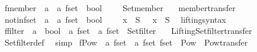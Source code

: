\begin{isabellebody}
\isanewline
{}\isamarkupfalse%
\ fmember\ {\isacharcolon}{\isacharcolon}\ {\isachardoublequoteopen}{\isacharprime}a\ {\isasymRightarrow}\ {\isacharprime}a\ fset\ {\isasymRightarrow}\ bool{\isachardoublequoteclose}\ {\isacharparenleft}\ {\isachardoublequoteopen}{\isacharbar}{\isasymin}{\isacharbar}{\isachardoublequoteclose}\ {}{}{\isacharparenright}\ \ Set{\isachardot}member\isanewline
\ \ \ member{\isacharunderscore}transfer%
\isadelimproof
\ %
\endisadelimproof
%
\isatagproof
\isacommand{{\isachardot}}\isamarkupfalse%
%
\endisatagproof
{\isafoldproof}%
%
\isadelimproof
%
\endisadelimproof
\isanewline
\isanewline
{}\isamarkupfalse%
\ notin{\isacharunderscore}fset\ {\isacharcolon}{\isacharcolon}\ {\isachardoublequoteopen}{\isacharprime}a\ {\isasymRightarrow}\ {\isacharprime}a\ fset\ {\isasymRightarrow}\ bool{\isachardoublequoteclose}\ {\isacharparenleft}\ {\isachardoublequoteopen}{\isacharbar}{\isasymnotin}{\isacharbar}{\isachardoublequoteclose}\ {}{}{\isacharparenright}\ \ {\isachardoublequoteopen}x\ {\isacharbar}{\isasymnotin}{\isacharbar}\ S\ {\isasymequiv}\ {\isasymnot}\ {\isacharparenleft}x\ {\isacharbar}{\isasymin}{\isacharbar}\ S{\isacharparenright}{\isachardoublequoteclose}\isanewline
\isanewline
{}\isamarkupfalse%
\ \ lifting{\isacharunderscore}syntax\isanewline
{}\isanewline
\isanewline
{}\isamarkupfalse%
\ ffilter\ {\isacharcolon}{\isacharcolon}\ {\isachardoublequoteopen}{\isacharparenleft}{\isacharprime}a\ {\isasymRightarrow}\ bool{\isacharparenright}\ {\isasymRightarrow}\ {\isacharprime}a\ fset\ {\isasymRightarrow}\ {\isacharprime}a\ fset{\isachardoublequoteclose}\ \ Set{\isachardot}filter\isanewline
\ \ \ Lifting{\isacharunderscore}Set{\isachardot}filter{\isacharunderscore}transfer%
\isadelimproof
\ %
\endisadelimproof
%
\isatagproof
{}\isamarkupfalse%
\ Set{\isachardot}filter{\isacharunderscore}def\ \isamarkupfalse%
\ simp%
\endisatagproof
{\isafoldproof}%
%
\isadelimproof
%
\endisadelimproof
\isanewline
\isanewline
{}\isamarkupfalse%
\ fPow\ {\isacharcolon}{\isacharcolon}\ {\isachardoublequoteopen}{\isacharprime}a\ fset\ {\isasymRightarrow}\ {\isacharprime}a\ fset\ fset{\isachardoublequoteclose}\ \ Pow\ \ Pow{\isacharunderscore}transfer\isanewline

\end{isabellebody}
